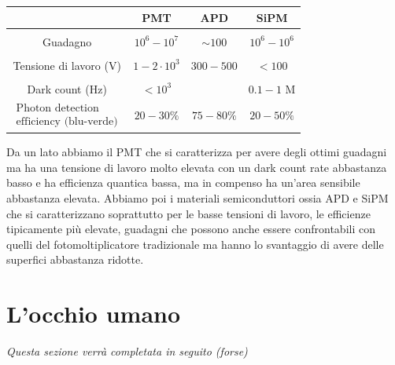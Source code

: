 \begin{center}
   \begin{tabular}{|c|c|c|c|}
      \hline
       & PMT & APD & SiPM\\
      \hline
      &&&\\[-0.45cm]
      Guadagno & $10^6-10^7$ & $\sim 100$ & $10^6-10^6$\\
      \hline
      &&&\\[-0.45cm]
      Tensione di lavoro (V) & $1-2 \cdot 10^3$ & $300 - 500$ & $<100$\\
      \hline
      &&&\\[-0.45cm]
      Dark count (Hz) & $<10^3$ & & $0.1-1$ M\\
      \hline
      $\begin{array}{cc}
         \text{Photon detection}\\
         \text{efficiency (blu-verde)}
      \end{array}$
      & $20-30\%$ & $75-80\%$ & $20-50\%$\\
      \hline
   \end{tabular}
\end{center}
Da un lato abbiamo il PMT che si caratterizza per avere degli ottimi guadagni ma ha una tensione di lavoro molto elevata con un dark count rate abbastanza basso e ha efficienza quantica bassa, ma in compenso ha un'area sensibile abbastanza elevata. Abbiamo poi i materiali semiconduttori ossia APD e SiPM che si caratterizzano soprattutto per le basse tensioni di lavoro, le efficienze tipicamente più elevate, guadagni che possono anche essere confrontabili con quelli del fotomoltiplicatore tradizionale ma hanno lo svantaggio di avere delle superfici abbastanza ridotte.

\section{L'occhio umano}

\textit{Questa sezione verrà completata in seguito (forse)}

